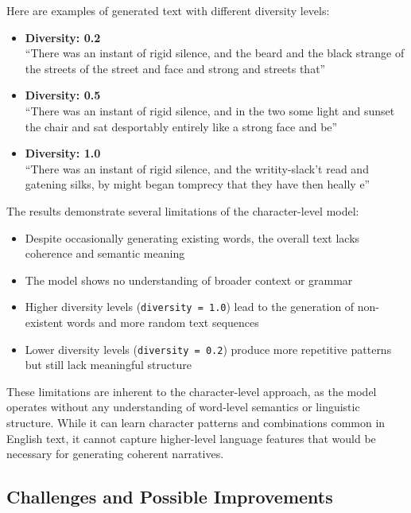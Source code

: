 \documentclass[12pt]{article}
\begin{document}
Here are examples of generated text with different diversity levels:

\begin{itemize}
    \item \textbf{Diversity: 0.2}\\
    ``There was an instant of rigid silence, and the beard and the black strange of the streets of the street and face and strong and streets that''
    
    \item \textbf{Diversity: 0.5}\\
    ``There was an instant of rigid silence, and in the two some light and sunset the chair and sat desportably entirely like a strong face and be''
    
    \item \textbf{Diversity: 1.0}\\
    ``There was an instant of rigid silence, and the writity-slack't read and gatening silks, by might began tomprecy that they have then heally e''
\end{itemize}

The results demonstrate several limitations of the character-level model:

\begin{itemize}
    \item Despite occasionally generating existing words, the overall text lacks coherence and semantic meaning
    \item The model shows no understanding of broader context or grammar
    \item Higher diversity levels (\texttt{diversity = 1.0}) lead to the generation of non-existent words and more random text sequences
    \item Lower diversity levels (\texttt{diversity = 0.2}) produce more repetitive patterns but still lack meaningful structure
\end{itemize}

These limitations are inherent to the character-level approach, as the model operates without any understanding of word-level semantics or linguistic structure. While it can learn character patterns and combinations common in English text, it cannot capture higher-level language features that would be necessary for generating coherent narratives.

\subsection{Challenges and Possible Improvements}
\end{document}
